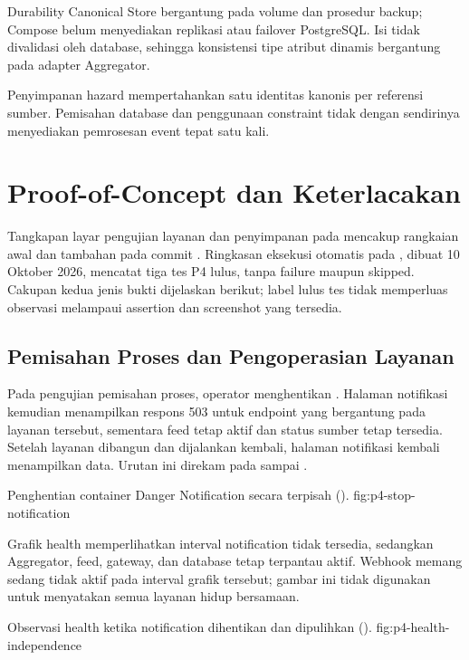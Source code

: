 Durability Canonical Store bergantung pada volume 
dan prosedur backup; Compose belum menyediakan replikasi atau failover
PostgreSQL. Isi  tidak divalidasi oleh database, sehingga
konsistensi tipe atribut dinamis bergantung pada adapter Aggregator.

Penyimpanan hazard mempertahankan satu identitas kanonis per referensi
sumber. Pemisahan database dan penggunaan constraint tidak
dengan sendirinya menyediakan pemrosesan event tepat satu kali.

\section{Proof-of-Concept dan Keterlacakan}

Tangkapan layar pengujian layanan dan penyimpanan pada  mencakup rangkaian awal
dan tambahan  pada commit . Ringkasan eksekusi otomatis pada
, dibuat 10 Oktober 2026,
mencatat tiga tes P4 lulus, tanpa failure maupun skipped. Cakupan kedua
jenis bukti dijelaskan berikut; label lulus tes tidak memperluas observasi
melampaui assertion dan screenshot yang tersedia.

\subsection{Pemisahan Proses dan Pengoperasian Layanan}

Pada pengujian pemisahan proses, operator menghentikan . Halaman
notifikasi kemudian menampilkan respons 503 untuk endpoint yang bergantung
pada layanan tersebut, sementara feed tetap aktif dan status sumber tetap
tersedia. Setelah layanan dibangun dan dijalankan kembali, halaman
notifikasi kembali menampilkan data. Urutan ini direkam pada
 sampai .

{Penghentian container Danger Notification secara terpisah ().}
{fig:p4-stop-notification}

Grafik health memperlihatkan interval notification tidak tersedia,
sedangkan Aggregator, feed, gateway, dan database tetap terpantau aktif.
Webhook memang sedang tidak aktif pada interval grafik tersebut; gambar
ini tidak digunakan untuk menyatakan semua layanan hidup bersamaan.

{Observasi health ketika notification dihentikan dan dipulihkan ().}
{fig:p4-health-independence}

